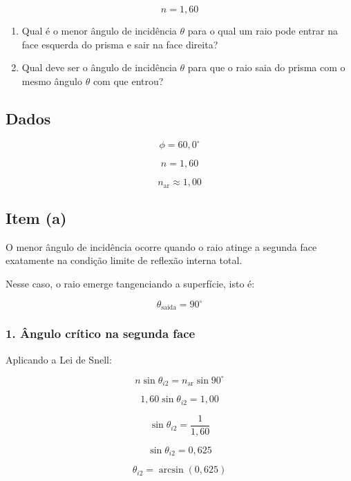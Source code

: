 \documentclass[12pt,a4paper]{article}
\begin{document}
\[
n = 1,60
\]

\begin{enumerate}
    \item[\textbf{(a)}] Qual é o menor ângulo de incidência $\theta$ para o qual um raio pode entrar na face esquerda do prisma e sair na face direita?
    
    \item[\textbf{(b)}] Qual deve ser o ângulo de incidência $\theta$ para que o raio saia do prisma com o mesmo ângulo $\theta$ com que entrou?
\end{enumerate}


\subsection*{Dados}

\[
\phi = 60,0^\circ
\]

\[
n = 1,60
\]

\[
n_{\text{ar}} \approx 1,00
\]


\subsection*{Item (a)}

O menor ângulo de incidência ocorre quando o raio atinge a segunda face exatamente na condição limite de reflexão interna total.

Nesse caso, o raio emerge tangenciando a superfície, isto é:

\[
\theta_{\text{saída}} = 90^\circ
\]


\subsubsection*{1. Ângulo crítico na segunda face}

Aplicando a Lei de Snell:

\[
n\sin\theta_{i2}
=
n_{\text{ar}}\sin90^\circ
\]

\[
1,60\sin\theta_{i2}
=
1,00
\]

\[
\sin\theta_{i2}
=
\frac{1}{1,60}
\]

\[
\sin\theta_{i2}
=
0,625
\]

\[
\theta_{i2}
=
\arcsin(0,625)
\]
\end{document}
